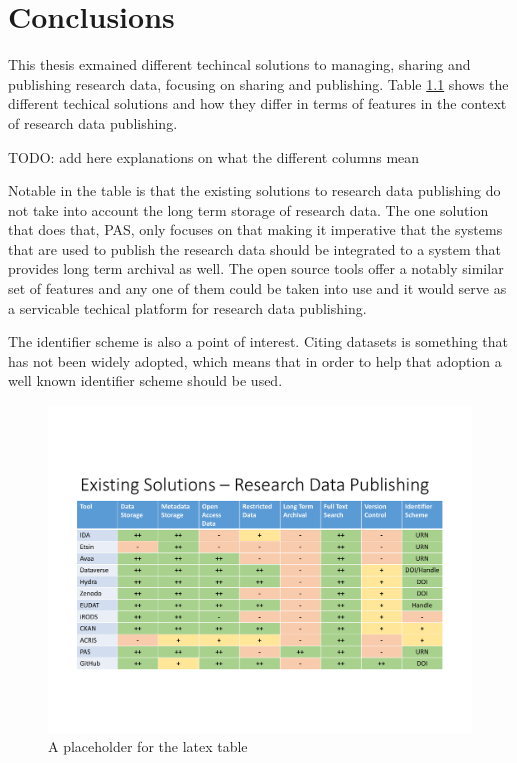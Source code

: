 \chapter{Conclusions}
\label{chapter:conclusions}

This thesis exmained different techincal solutions to managing, sharing and
publishing research data, focusing on sharing and publishing. Table
\ref{fig:solutions} shows the different techical solutions and how they
differ in terms of features in the context of research data publishing.

TODO: add here explanations on what the different columns mean

Notable in the table is that the existing solutions to research data publishing
do not take into account the long term storage of research data. The one
solution that does that, PAS, only focuses on that making it imperative that
the systems that are used to publish the research data should be integrated to
a system that provides long term archival as well. The open source tools offer
a notably similar set of features and any one of them could be taken into use
and it would serve as a servicable techical platform for research data
publishing.

The identifier scheme is also a point of interest. Citing datasets is something
that has not been widely adopted, which means that in order to help that
adoption a well known identifier scheme should be used.

\begin{figure}
    \begin{centering}
        \includegraphics[width=\textwidth]{images/publishing}
    \end{centering}
    \caption{A placeholder for the latex table}
    \label{fig:solutions}
\end{figure}

